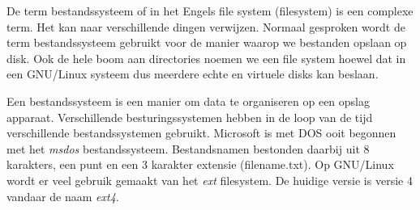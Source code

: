 De term bestandssysteem of in het Engels file system (filesystem) is een complexe term. Het kan naar verschillende dingen verwijzen. Normaal gesproken wordt de term bestandssysteem gebruikt voor de manier waarop we bestanden opslaan op disk. Ook de hele boom aan directories noemen we een file system hoewel dat in een GNU/Linux systeem dus meerdere echte en virtuele disks kan beslaan.

Een bestandssysteem is een manier om data te organiseren op een opslag apparaat. Verschillende besturingssystemen hebben in de loop van de tijd verschillende bestandssystemen gebruikt. Microsoft is met DOS ooit begonnen met het \textit{msdos} bestandssysteem. Bestandsnamen bestonden daarbij uit 8 karakters, een punt en een 3 karakter extensie (filename.txt). Op GNU/Linux wordt er veel gebruik gemaakt van het \textit{ext} filesystem. De huidige versie is versie 4 vandaar de naam \textit{ext4}.

